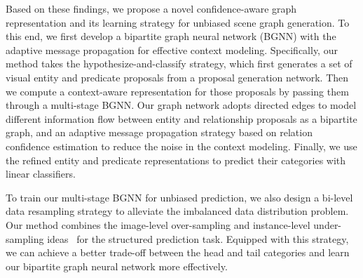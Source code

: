Based on these findings, we propose a novel confidence-aware graph representation and its learning strategy for unbiased scene graph generation. To this end, we first develop a bipartite graph neural network (BGNN) with the adaptive message propagation for effective context modeling. 
Specifically, our method takes the hypothesize-and-classify strategy, which first generates a set of visual entity and predicate proposals from a proposal generation network. Then we compute a context-aware representation for those proposals by passing them through a multi-stage BGNN. 
Our graph network adopts directed edges to model different information flow between entity and relationship proposals as a bipartite graph, and an adaptive message propagation strategy based on relation confidence estimation to reduce the noise in the context modeling. Finally, we use the refined entity and predicate representations to predict their categories with linear classifiers. 

To train our multi-stage BGNN for unbiased prediction, we also design a bi-level data resampling strategy to alleviate the imbalanced data distribution problem. Our method combines the image-level over-sampling and instance-level under-sampling ideas~\cite{hu_learning_2020,gupta_lvis:_2019} for the structured prediction task. Equipped with this strategy, we can achieve a better trade-off between the head and tail categories and learn our bipartite graph neural network more effectively.





